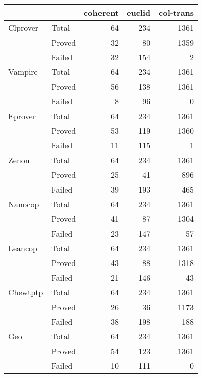 \documentclass{article}
\begin{document}
\begin{tabular}{llrrr}
\toprule
 &  &  coherent & euclid & col-trans \\
\midrule
Clprover & Total &64 & 234 & 1361 \\
      & Proved & 32 & 80 & 1359 \\
      & Failed & 32 & 154 & 2 \\
Vampire & Total &64 & 234 & 1361 \\
      & Proved & 56 & 138 & 1361 \\
      & Failed & 8 & 96 & 0 \\
Eprover & Total &64 & 234 & 1361 \\
      & Proved & 53 & 119 & 1360 \\
      & Failed & 11 & 115 & 1 \\
Zenon & Total &64 & 234 & 1361 \\
      & Proved & 25 & 41 & 896 \\
      & Failed & 39 & 193 & 465 \\
Nanocop & Total &64 & 234 & 1361 \\
      & Proved & 41 & 87 & 1304 \\
      & Failed & 23 & 147 & 57 \\
Leancop & Total &64 & 234 & 1361 \\
      & Proved & 43 & 88 & 1318 \\
      & Failed & 21 & 146 & 43 \\
Chewtptp & Total &64 & 234 & 1361 \\
      & Proved & 26 & 36 & 1173 \\
      & Failed & 38 & 198 & 188 \\
Geo & Total &64 & 234 & 1361 \\
      & Proved & 54 & 123 & 1361 \\
      & Failed & 10 & 111 & 0 \\
\bottomrule
\end{tabular}
\end{document}
